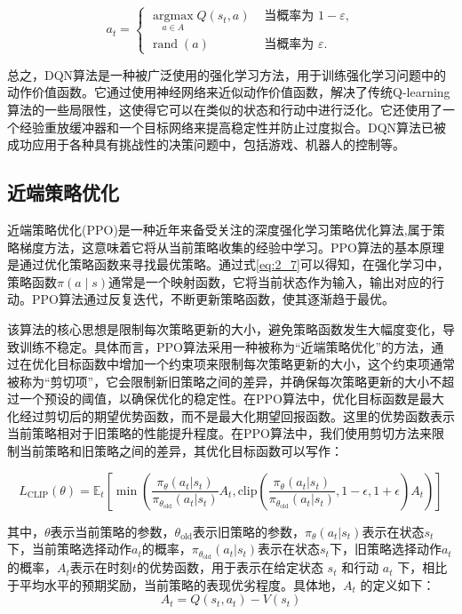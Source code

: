 \begin{equation}
\label{eq:2_23}
{a}_{t}= \begin{cases}\underset{{a} \in A}{\operatorname{argmax}} Q\left({s}_{t} ,{a}\right) & \text { 当概率为 } 1-\varepsilon, \\ \operatorname{rand}({a}) & \text { 当概率为 } \varepsilon.\end{cases}
\end{equation}


总之，DQN算法是一种被广泛使用的强化学习方法，用于训练强化学习问题中的动作价值函数。它通过使用神经网络来近似动作价值函数，解决了传统Q-learning算法的一些局限性，这使得它可以在类似的状态和行动中进行泛化。它还使用了一个经验重放缓冲器和一个目标网络来提高稳定性并防止过度拟合。DQN算法已被成功应用于各种具有挑战性的决策问题中，包括游戏、机器人的控制等。


\subsection{近端策略优化}

近端策略优化(PPO)是一种近年来备受关注的深度强化学习策略优化算法,属于策略梯度方法，这意味着它将从当前策略收集的经验中学习。PPO算法的基本原理是通过优化策略函数来寻找最优策略。通过式\ref{eq:2_7}可以得知，在强化学习中，策略函数$\pi(a \mid s)$通常是一个映射函数，它将当前状态作为输入，输出对应的行动。PPO算法通过反复迭代，不断更新策略函数，使其逐渐趋于最优。

该算法的核心思想是限制每次策略更新的大小，避免策略函数发生大幅度变化，导致训练不稳定。具体而言，PPO算法采用一种被称为“近端策略优化”的方法，通过在优化目标函数中增加一个约束项来限制每次策略更新的大小，这个约束项通常被称为“剪切项”，它会限制新旧策略之间的差异，并确保每次策略更新的大小不超过一个预设的阈值，以确保优化的稳定性。在PPO算法中，优化目标函数是最大化经过剪切后的期望优势函数，而不是最大化期望回报函数。这里的优势函数表示当前策略相对于旧策略的性能提升程度。在PPO算法中，我们使用剪切方法来限制当前策略和旧策略之间的差异，其优化目标函数可以写作：

\begin{equation}
\label{eq:2_24}
L_{\text{CLIP}}(\theta) = \mathbb{E}_t\left[\min\left(\frac{\pi_{\theta}(a_t|s_t)}{\pi_{\theta_{\text{old}}}(a_t|s_t)}A_t, \text{clip}\left(\frac{\pi_{\theta}(a_t|s_t)}{\pi_{\theta_{\text{old}}}(a_t|s_t)}, 1-\epsilon, 1+\epsilon\right)A_t\right)\right]
\end{equation}

其中，$\theta$表示当前策略的参数，$\theta_{\text{old}}$表示旧策略的参数，$\pi_{\theta}(a_t|s_t)$表示在状态$s_t$下，当前策略选择动作$a_t$的概率，$\pi_{\theta_{\text{old}}}(a_t|s_t)$表示在状态$s_t$下，旧策略选择动作$a_t$的概率，$A_t$表示在时刻$t$的优势函数，用于表示在给定状态 $s_t$ 和行动 $a_t$ 下，相比于平均水平的预期奖励，当前策略的表现优劣程度。具体地，$A_t$ 的定义如下：
\begin{equation}
\label{eq:2_25}
A_t = Q(s_t, a_t) - V(s_t)
\end{equation}

